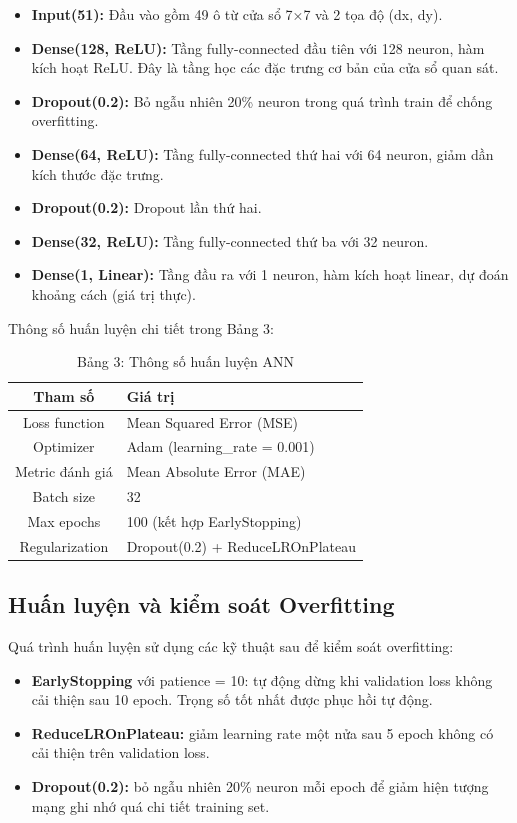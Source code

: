 \documentclass[12pt,a4paper]{article}
\begin{document}
\begin{itemize}
    \item \textbf{Input(51):} Đầu vào gồm 49 ô từ cửa sổ 7×7 và 2 tọa độ (dx, dy).
    \item \textbf{Dense(128, ReLU):} Tầng fully-connected đầu tiên với 128 neuron, hàm kích hoạt ReLU. Đây là tầng học các đặc trưng cơ bản của cửa sổ quan sát.
    \item \textbf{Dropout(0.2):} Bỏ ngẫu nhiên 20\% neuron trong quá trình train để chống overfitting.
    \item \textbf{Dense(64, ReLU):} Tầng fully-connected thứ hai với 64 neuron, giảm dần kích thước đặc trưng.
    \item \textbf{Dropout(0.2):} Dropout lần thứ hai.
    \item \textbf{Dense(32, ReLU):} Tầng fully-connected thứ ba với 32 neuron.
    \item \textbf{Dense(1, Linear):} Tầng đầu ra với 1 neuron, hàm kích hoạt linear, dự đoán khoảng cách (giá trị thực).
\end{itemize}

Thông số huấn luyện chi tiết trong Bảng 3:

\begin{table}[ht]
\centering
\begin{tabular}{|c|l|}
\hline
\textbf{Tham số} & \textbf{Giá trị} \\
\hline
Loss function & Mean Squared Error (MSE) \\
Optimizer & Adam (learning\_rate = 0.001) \\
Metric đánh giá & Mean Absolute Error (MAE) \\
Batch size & 32 \\
Max epochs & 100 (kết hợp EarlyStopping) \\
Regularization & Dropout(0.2) + ReduceLROnPlateau \\
\hline
\end{tabular}
\caption{Bảng 3: Thông số huấn luyện ANN}
\label{tab:params}
\end{table}

\subsection{Huấn luyện và kiểm soát Overfitting}

Quá trình huấn luyện sử dụng các kỹ thuật sau để kiểm soát overfitting:

\begin{itemize}
    \item \textbf{EarlyStopping} với patience = 10: tự động dừng khi validation loss không cải thiện sau 10 epoch. Trọng số tốt nhất được phục hồi tự động.
    \item \textbf{ReduceLROnPlateau:} giảm learning rate một nửa sau 5 epoch không có cải thiện trên validation loss.
    \item \textbf{Dropout(0.2):} bỏ ngẫu nhiên 20\% neuron mỗi epoch để giảm hiện tượng mạng ghi nhớ quá chi tiết training set.
\end{itemize}
\end{document}
